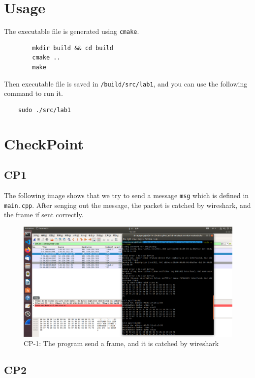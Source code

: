 \documentclass[11pt]{article}
\begin{document}
	\section{Usage}
	
	The executable file is generated using \texttt{cmake}.
	
	\lstset{language = bash}
	\begin{lstlisting}
		mkdir build && cd build
		cmake ..
		make
	\end{lstlisting}
	
	Then executable file is saved in \texttt{/build/src/lab1}, and you can use the following command to run it.
	
	\begin{lstlisting}
	sudo ./src/lab1
	\end{lstlisting}

	\section{CheckPoint}
	
	\subsection*{CP1}
	
	The following image shows that we try to send a message \texttt{msg} which is defined in \texttt{main.cpp}. After senging out the message, the packet is catched by wireshark, and the frame if sent correctly.
	
	\begin{figure}[htbp]
	\centering
	\includegraphics[width=0.65\linewidth]{../lab-netstack-premium-master/checkpoints/CP1.png}
	\caption{CP-1: The program send a frame, and it is catched by wireshark}
	\label{fig:CP1}
	\end{figure}
	
	\subsection*{CP2}
	
\end{document}

